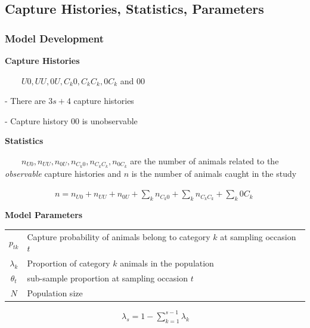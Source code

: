 \documentclass{beamer}
\begin{document}
\subsection{Capture Histories, Statistics, Parameters}
\begin{frame} \frametitle{Model Development}
\textbf{{\footnotesize Capture Histories}}
\vspace{2pt}

{\scriptsize 
$\qquad U0, UU, 0U, C_{k}0, C_{k}C_{k}, 0C_{k}$ and $00$
\vspace{2pt}

\hspace{1.5cm}- There are $3s + 4$ capture histories
\vspace{2pt}

\hspace{1.5cm}- Capture history $00$ is unobservable
}
\vspace{6pt}

\textbf{{\footnotesize Statistics}}
\vspace{2pt}

{\scriptsize 
$\qquad n_{U0}, n_{UU}, n_{0U}, n_{C_{k}0}, n_{ C_{k}C_{k}},n_{0C_{k}}$  are the number of animals related to the \textit{observable} capture histories
 and $n$ is the number of animals  caught in the study 
 
 $\qquad \qquad \qquad n =n_{U0}+n_{UU}+n_{0U}+  \sum\limits_{k} n_{C_{k}0} +  \sum\limits_{k} n_{ C_{k}C_{k}} +  \sum\limits_{k} 0C_{k}    $
}
\vspace{6pt}

\textbf{{\footnotesize Model Parameters}}
\vspace{2pt}
{\tiny 
\begin{center}
\begin{tabular}{c l}
\vspace{4pt}
$p_{tk}$ &Capture probability of animals belong to category $k$ at sampling occasion $t$\\ \vspace{4pt}
$\lambda_k $ & Proportion of category $k$ animals in the population\\ \vspace{4pt}
$\theta_t$ & sub-sample proportion at sampling occasion $t$\\ \vspace{4pt}
$N$ & Population size 
\end{tabular}
\end{center}
$\qquad \qquad \qquad \qquad \qquad \qquad \qquad \lambda_s  = 1 - \sum\limits_{k=1}^{s-1}\lambda_k $
}
\end{frame}
\end{document}
